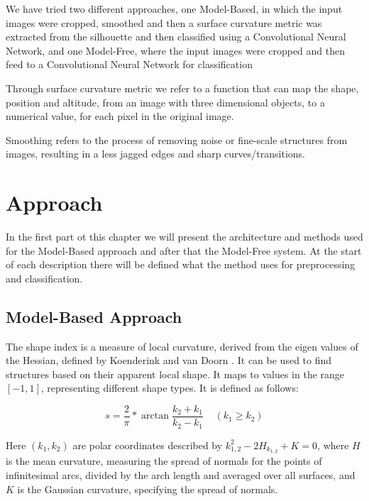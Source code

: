 \documentclass[12pt]{article}
\theoremstyle{definition}
\begin{document}
	We have tried two different approaches, one Model-Based, in which the input images were cropped, smoothed and then a surface curvature metric was extracted from the silhouette and then classified using a Convolutional Neural Network, and one Model-Free, where the input images were cropped and then feed to a Convolutional Neural Network for classification
	
	Through surface curvature metric we refer to a function that can map the shape, position and altitude, from an image with three dimensional objects, to a numerical value, for each pixel in the original image.
	
	Smoothing refers to the process of removing noise or fine-scale structures from images, resulting in a less jagged edges and sharp curves/transitions.
	
	\newpage
	
	\section{Approach}
	\vspace{1cm}
	
	In the first part ot this chapter we will present the architecture and methods used for the Model-Based approach and after that the Model-Free system. At the start of each description there will be defined what the method uses for preprocessing and classification.
	
	\subsection{Model-Based Approach}
	
	The shape index is a measure of local curvature, derived from the eigen values of the Hessian, defined by Koenderink and van Doorn \cite{shape-index}. It can be used to find structures based on their apparent local shape. It maps to values in the range $[-1, 1]$, representing different shape types. It is defined as follows:
	
	\begin{equation*}
	s=\frac{2}{\pi}*\arctan{\frac{k_2+k_1}{k_2-k_1}} \;\;\;\;  (k_1 \geq k_2)
	\end{equation*}
	
	Here $(k_1, k_2)$ are polar coordinates described by $k_{1,2}^2-2H_{k_{1,2}}+K=0$, where $H$ is the mean curvature, measuring the spread of normals for the points of infinitesimal arcs, divided by the arch length and averaged over all surfaces, and $K$ is the Gaussian curvature, specifying the spread of normals.
	
\end{document}
